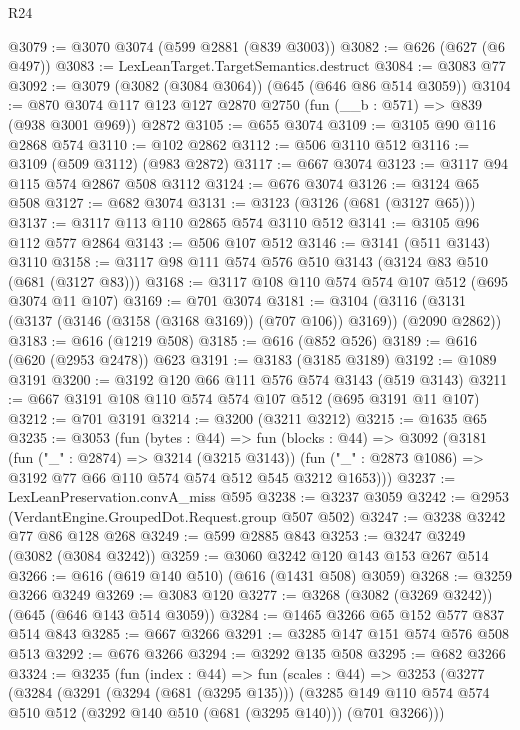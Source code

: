\begin{lexlean}{R24}
\begin{coremodule}
@3079 := @3070 @3074 (@599 @2881 (@839 @3003))
@3082 := @626 (@627 (@6 @497))
@3083 := LexLeanTarget.TargetSemantics.destruct
@3084 := @3083 @77
@3092 := @3079 (@3082 (@3084 @3064)) (@645 (@646 @86 @514 @3059))
@3104 := @870 @3074 @117 @123 @127 @2870 @2750 (fun (__b : @571) => @839 (@938 @3001 @969)) @2872
@3105 := @655 @3074
@3109 := @3105 @90 @116 @2868 @574
@3110 := @102 @2862
@3112 := @506 @3110 @512
@3116 := @3109 (@509 @3112) (@983 @2872)
@3117 := @667 @3074
@3123 := @3117 @94 @115 @574 @2867 @508 @3112
@3124 := @676 @3074
@3126 := @3124 @65 @508
@3127 := @682 @3074
@3131 := @3123 (@3126 (@681 (@3127 @65)))
@3137 := @3117 @113 @110 @2865 @574 @3110 @512
@3141 := @3105 @96 @112 @577 @2864
@3143 := @506 @107 @512
@3146 := @3141 (@511 @3143) @3110
@3158 := @3117 @98 @111 @574 @576 @510 @3143 (@3124 @83 @510 (@681 (@3127 @83)))
@3168 := @3117 @108 @110 @574 @574 @107 @512 (@695 @3074 @11 @107)
@3169 := @701 @3074
@3181 := @3104 (@3116 (@3131 (@3137 (@3146 (@3158 (@3168 @3169)) (@707 @106)) @3169)) (@2090 @2862))
@3183 := @616 (@1219 @508)
@3185 := @616 (@852 @526)
@3189 := @616 (@620 (@2953 @2478)) @623
@3191 := @3183 (@3185 @3189)
@3192 := @1089 @3191
@3200 := @3192 @120 @66 @111 @576 @574 @3143 (@519 @3143)
@3211 := @667 @3191 @108 @110 @574 @574 @107 @512 (@695 @3191 @11 @107)
@3212 := @701 @3191
@3214 := @3200 (@3211 @3212)
@3215 := @1635 @65
@3235 := @3053
    (fun (bytes : @44) =>
    fun (blocks : @44) =>
    @3092
      (@3181
        (fun ("_" : @2874) => @3214 (@3215 @3143))
        (fun ("_" : @2873 @1086) => @3192 @77 @66 @110 @574 @574 @512 @545 @3212 @1653)))
@3237 := LexLeanPreservation.convA_miss @595
@3238 := @3237 @3059
@3242 := @2953 (VerdantEngine.GroupedDot.Request.group @507 @502)
@3247 := @3238 @3242 @77 @86 @128 @268
@3249 := @599 @2885 @843
@3253 := @3247 @3249 (@3082 (@3084 @3242))
@3259 := @3060 @3242 @120 @143 @153 @267 @514
@3266 := @616 (@619 @140 @510) (@616 (@1431 @508) @3059)
@3268 := @3259 @3266 @3249
@3269 := @3083 @120
@3277 := @3268 (@3082 (@3269 @3242)) (@645 (@646 @143 @514 @3059))
@3284 := @1465 @3266 @65 @152 @577 @837 @514 @843
@3285 := @667 @3266
@3291 := @3285 @147 @151 @574 @576 @508 @513
@3292 := @676 @3266
@3294 := @3292 @135 @508
@3295 := @682 @3266
@3324 := @3235
    (fun (index : @44) =>
    fun (scales : @44) =>
    @3253
      (@3277
        (@3284
          (@3291
            (@3294 (@681 (@3295 @135)))
            (@3285
              @149
              @110
              @574
              @574
              @510
              @512
              (@3292 @140 @510 (@681 (@3295 @140)))
              (@701 @3266)))

\end{coremodule}
\end{lexlean}

